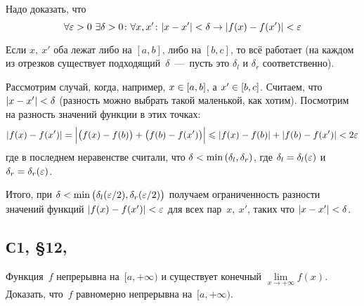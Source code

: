 \documentclass[a4paper,12pt]{article}
\begin{document}
  \begin{solution}
    Надо доказать, что  %
    \[
      \forall \eps > 0\ \exists \delta > 0\colon \forall x, x'\colon |x - x'| < \delta \to |f(x) - f(x')| < \eps
    \]

    Если $x,\ x'$ оба лежат либо на $[a, b]$, либо на $[b, c]$, то всё работает (на каждом из отрезков существует подходящий~$\delta$~---~пусть это $\delta_l$ и $\delta_r$ соответственно).

    Рассмотрим случай, когда, например, $x \hm\in [a, b]$, а $x' \hm\in [b, c]$.
    Считаем, что $|x \hm- x'| \hm< \delta$ (разность можно выбрать такой маленькой, как хотим).
    Посмотрим на разность значений функции в этих точках:
    \[
      |f(x) - f(x')| = \Bigl|\bigl(f(x) - f(b)\bigr) + \bigl(f(b) - f(x')\bigr)\Bigr|
        \leqslant |f(x) - f(b)| + |f(b) - f(x')| < 2 \varepsilon
    \]
    где в последнем неравенстве считали, что $\delta \hm< \min{(\delta_l, \delta_r)}$, где $\delta_l \hm= \delta_l(\eps)$ и $\delta_r \hm= \delta_r(\eps)$.

    Итого, при $\delta \hm< \min{\bigl(\delta_l(\eps/2), \delta_r(\eps/2)\bigr)}$ получаем ограниченность разности значений функций $|f(x) \hm- f(x')| \hm< \eps$ для всех пар~$x,\ x'$, таких что $|x \hm- x'| \hm< \delta$.
  \end{solution}
  
  
  
  \subsection{С1, \S 12, }
  
  Функция~$f$ непрерывна на~$[a, +\infty)$ и существует конечный $\lim\limits_{x \to +\infty} f(x)$.
  Доказать, что~$f$ равномерно непрерывна на~$[a, +\infty)$.
  
\end{document}
